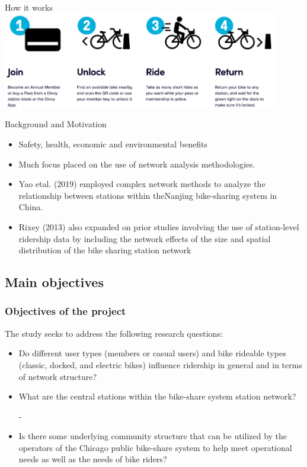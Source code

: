 \documentclass[11pt, xcolor=dvipsnames]{beamer}
\begin{document}
    \begin{frame}{How it works}
    	\centering
    	\includegraphics[width=12cm]{images/how-it-works-2}
    \end{frame}
	\begin{frame}{Background and Motivation}
		\begin{itemize}
			\item Safety, health, economic and environmental benefits
			\item Much focus placed on the use of network analysis methodologies.
			\item Yao etal. (2019) employed complex network methods to analyze the relationship between stations within theNanjing bike-sharing system in China.
			\item Rixey (2013) also expanded on prior studies involving the use of station-level ridership data by including the network effects of the size and spatial distribution of the bike sharing station network
		\end{itemize}
	\end{frame}
		\subsection{Main objectives}
		\begin{frame}
			\frametitle{Objectives of the project}
			The study seeks to address the following research questions:
			\begin{itemize}
				\item Do different user types (members or casual users) and bike rideable types (classic, docked, and electric bikes) influence ridership in general and in terms of network structure?
				
				\item What are the central stations within the bike-share system station network?
				
				-\item Is there some underlying community structure that can be utilized by the operators of the Chicago public bike-share system to help meet operational needs as well as the needs of bike riders?
			\end{itemize}
		\end{frame}
\end{document}
